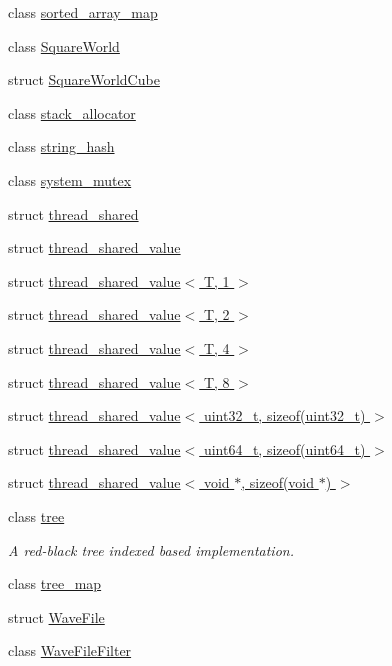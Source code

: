 \begin{DoxyCompactItemize}
class \hyperlink{classcrap_1_1sorted__array__map}{sorted\+\_\+array\+\_\+map}
\item 
class \hyperlink{classcrap_1_1_square_world}{Square\+World}
\item 
struct \hyperlink{structcrap_1_1_square_world_cube}{Square\+World\+Cube}
\item 
class \hyperlink{classcrap_1_1stack__allocator}{stack\+\_\+allocator}
\item 
class \hyperlink{classcrap_1_1string__hash}{string\+\_\+hash}
\item 
class \hyperlink{classcrap_1_1system__mutex}{system\+\_\+mutex}
\item 
struct \hyperlink{structcrap_1_1thread__shared}{thread\+\_\+shared}
\item 
struct \hyperlink{structcrap_1_1thread__shared__value}{thread\+\_\+shared\+\_\+value}
\item 
struct \hyperlink{structcrap_1_1thread__shared__value_3_01_t_00_011_01_4}{thread\+\_\+shared\+\_\+value$<$ T, 1 $>$}
\item 
struct \hyperlink{structcrap_1_1thread__shared__value_3_01_t_00_012_01_4}{thread\+\_\+shared\+\_\+value$<$ T, 2 $>$}
\item 
struct \hyperlink{structcrap_1_1thread__shared__value_3_01_t_00_014_01_4}{thread\+\_\+shared\+\_\+value$<$ T, 4 $>$}
\item 
struct \hyperlink{structcrap_1_1thread__shared__value_3_01_t_00_018_01_4}{thread\+\_\+shared\+\_\+value$<$ T, 8 $>$}
\item 
struct \hyperlink{structcrap_1_1thread__shared__value_3_01uint32__t_00_01sizeof_07uint32__t_08_01_4}{thread\+\_\+shared\+\_\+value$<$ uint32\+\_\+t, sizeof(uint32\+\_\+t) $>$}
\item 
struct \hyperlink{structcrap_1_1thread__shared__value_3_01uint64__t_00_01sizeof_07uint64__t_08_01_4}{thread\+\_\+shared\+\_\+value$<$ uint64\+\_\+t, sizeof(uint64\+\_\+t) $>$}
\item 
struct \hyperlink{structcrap_1_1thread__shared__value_3_01void_01_5_00_01sizeof_07void_01_5_08_01_4}{thread\+\_\+shared\+\_\+value$<$ void $\ast$, sizeof(void $\ast$) $>$}
\item 
class \hyperlink{classcrap_1_1tree}{tree}
\begin{DoxyCompactList}\small\item\em A red-\/black tree indexed based implementation. \end{DoxyCompactList}\item 
class \hyperlink{classcrap_1_1tree__map}{tree\+\_\+map}
\item 
struct \hyperlink{structcrap_1_1_wave_file}{Wave\+File}
\item 
class \hyperlink{classcrap_1_1_wave_file_filter}{Wave\+File\+Filter}
\end{DoxyCompactItemize}
